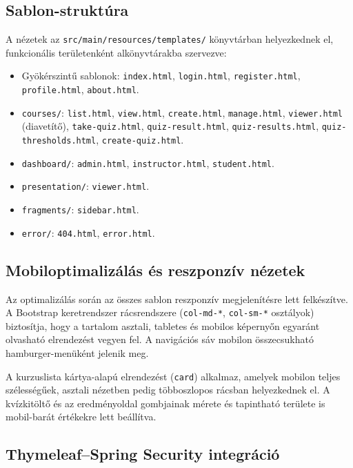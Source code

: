 \subsection{Sablon-struktúra}

A nézetek az \texttt{src/main/resources/templates/} könyvtárban helyezkednek el, funkcionális területenként alkönyvtárakba szervezve:

\begin{sloppypar}
\begin{itemize}
    \item Gyökérszintű sablonok: \texttt{index.html}, \texttt{login.html}, \texttt{register.html}, \texttt{profile.html}, \texttt{about.html}.
    \item \texttt{courses/}: \texttt{list.html}, \texttt{view.html}, \texttt{create.html}, \texttt{manage.html}, \texttt{viewer.html} (diavetítő), \texttt{take-quiz.html}, \texttt{quiz-result.html}, \texttt{quiz-results.html}, \texttt{quiz-thresholds.html}, \texttt{create-quiz.html}.
    \item \texttt{dashboard/}: \texttt{admin.html}, \texttt{instructor.html}, \texttt{student.html}.
    \item \texttt{presentation/}: \texttt{viewer.html}.
    \item \texttt{fragments/}: \texttt{sidebar.html}.
    \item \texttt{error/}: \texttt{404.html}, \texttt{error.html}.
\end{itemize}
\end{sloppypar}

\subsection{Mobiloptimalizálás és reszponzív nézetek}

Az optimalizálás során az összes sablon reszponzív megjelenítésre lett felkészítve. A Bootstrap keretrendszer rácsrendszere (\texttt{col-md-*}, \texttt{col-sm-*} osztályok) biztosítja, hogy a tartalom asztali, tabletes és mobilos képernyőn egyaránt olvasható elrendezést vegyen fel. A navigációs sáv mobilon összecsukható hamburger-menüként jelenik meg.

A kurzuslista kártya-alapú elrendezést (\texttt{card}) alkalmaz, amelyek mobilon teljes szélességűek, asztali nézetben pedig többoszlopos rácsban helyezkednek el. A kvízkitöltő és az eredményoldal gombjainak mérete és tapintható területe is mobil-barát értékekre lett beállítva.

\subsection{Thymeleaf–Spring Security integráció}

